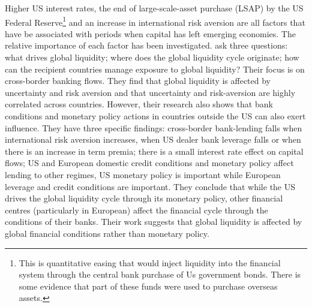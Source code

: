 \documentclass[12pt, a4paper, oneside]{article}\usepackage[]{graphicx}\usepackage[]{color}
\begin{document}
Higher US interest rates, the end of large-scale-asset purchase (LSAP) by the US Federal Reserve\footnote{This is quantitative easing that would inject liquidity into the financial system through the central bank purchase of Us government bonds.  There is some evidence that part of these funds were used to purchase overseas assets. } and an increase in international risk aversion are all factors that have be associated with periods when capital has left emerging economies. The relative importance of each factor has been investigated.  \citet{Cerutti2014} ask three questions:  what drives global liquidity; where does the global liquidity cycle originate; how can the recipient countries manage exposure to global liquidity?  Their focus is on cross-border banking flows. They find that global liquidity is affected by uncertainty and risk aversion and that uncertainty and risk-aversion are highly correlated across countries. However, their research also shows that bank conditions and monetary policy actions in countries outside the US can also exert influence. They have three specific findings:  cross-border bank-lending falls when international risk aversion increases, when US dealer bank leverage falls or when there is an increase in term premia; there is a small interest rate effect on capital flows; US and European domestic credit conditions and monetary policy affect lending to other regimes, US monetary policy is important while European leverage and credit conditions are important.  They conclude that while the US drives the global liquidity cycle through its monetary policy, other financial centres (particularly in European) affect the financial cycle through the conditions of their banks. Their work suggests that global liquidity is affected by global financial conditions rather than monetary policy.
\end{document}
